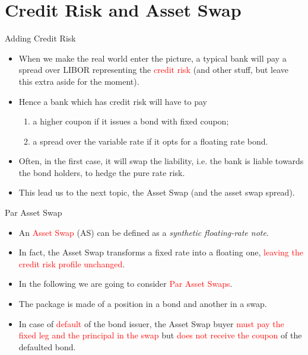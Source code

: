 \documentclass{beamer}
\begin{document}
\section{Credit Risk and Asset Swap}
\begin{frame}{Adding Credit Risk}
	\begin{itemize}
		\item When we make the real world enter the picture, a typical bank will pay a spread over LIBOR representing the \textcolor{red}{credit risk} (and other stuff, but leave this extra aside for the moment). 
		\item<2-> Hence a bank which has credit risk will have to pay
		\begin{enumerate}
			\item a higher coupon if it issues a bond with fixed coupon;
			\item a spread over the variable rate if it opts for a floating rate bond.
		\end{enumerate}
		\item<3-> Often, in the first case, it will swap the liability, i.e. the bank is liable towards the bond holders, to hedge the pure rate risk. 
		\item<4-> This lead us to the next topic, the Asset Swap (and the asset swap spread).
	\end{itemize}
\end{frame}

\begin{frame}{Par Asset Swap}
	\begin{itemize}
		\item<1-> An \textcolor{red}{Asset Swap} (AS) can be defined as a \emph{synthetic floating-rate note}.
		\item In fact, the Asset Swap transforms a fixed rate into a floating one, \textcolor{red}{leaving the credit risk profile unchanged}.
		\item<1-> In the following we are going to consider \textcolor{red}{Par Asset Swaps}. 
		\item<2-> The package is made of a position in a bond and another in a swap.
		\item<3-> In case of \textcolor{red}{default} of the bond issuer, the Asset Swap buyer \textcolor{red}{must pay the fixed leg and the principal in the swap} but \textcolor{red}{does not receive the coupon} of the defaulted bond. 
	\end{itemize}
\end{frame}
\end{document}
